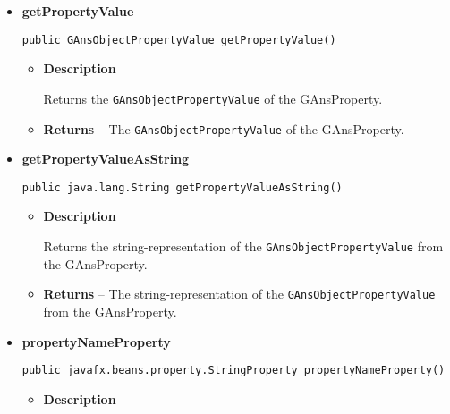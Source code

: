 {{{{{{{{{{{\begin{itemize}
{\begin{itemize}
{Returns the name/identifier of the GAnsProperty.
}
\item{{\bf  Returns} -- 
The name/identifier of the GAnsProperty. 
}%
\end{itemize}
}%
\item{ 
{\bf  getPropertyValue}\\
\begin{lstlisting}[frame=none]
public GAnsObjectPropertyValue getPropertyValue()\end{lstlisting} %
\begin{itemize}
\item{
{\bf  Description}

Returns the \texttt{\small GAnsObjectPropertyValue}{\small 
{}} of the GAnsProperty.
}
\item{{\bf  Returns} -- 
The \texttt{\small GAnsObjectPropertyValue}{\small 
{}} of the GAnsProperty. 
}%
\end{itemize}
}%
\item{ 
{\bf  getPropertyValueAsString}\\
\begin{lstlisting}[frame=none]
public java.lang.String getPropertyValueAsString()\end{lstlisting} %
\begin{itemize}
\item{
{\bf  Description}

Returns the string-representation of the \texttt{\small GAnsObjectPropertyValue}{\small 
{}} from the GAnsProperty.
}
\item{{\bf  Returns} -- 
The string-representation of the \texttt{\small GAnsObjectPropertyValue}{\small 
{}} from the GAnsProperty. 
}%
\end{itemize}
}%
\item{ 
{\bf  propertyNameProperty}\\
\begin{lstlisting}[frame=none]
public javafx.beans.property.StringProperty propertyNameProperty()\end{lstlisting} %
\begin{itemize}
\item{
{\bf  Description}

}
\end{itemize}}
\end{itemize}}}}}}}}}}}}
